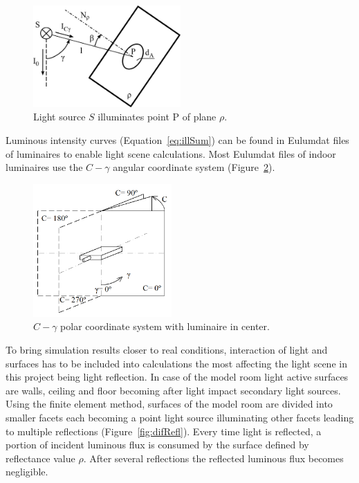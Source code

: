 \begin{figure}[htb]
  \centering
  \includegraphics[width=160pt]{315_osvetlenost_bodovym_zdrojem_2}
  \caption{Light source $S$ illuminates point P of plane $\rho$.}
  \label{fig:osv}
\end{figure}

Luminous intensity curves (Equation~\ref{eq:illSum}) can be found in Eulumdat files of luminaires to enable light scene calculations. Most Eulumdat files of indoor luminaires use the $C-\gamma$ angular coordinate system (Figure~\ref{fig:cgamma}).

\begin{figure}[htb]
  \centering
  \includegraphics[width=150pt]{Cgama}
  \caption{$C-\gamma$ polar coordinate system with luminaire in center.}
  \label{fig:cgamma}
\end{figure}

To bring simulation results closer to real conditions, interaction of light and surfaces has to be included into calculations the most affecting the light scene in this project being light reflection. In case of the model room light active surfaces are walls, ceiling and floor becoming after light impact secondary light sources. Using the finite element method, surfaces of the model room are divided into smaller facets each becoming a point light source illuminating other facets leading to multiple reflections (Figure~\ref{fig:difRefl}). Every time light is reflected, a portion of incident luminous flux is consumed by the surface defined by reflectance value $\rho$. After several reflections the reflected luminous flux becomes negligible.

